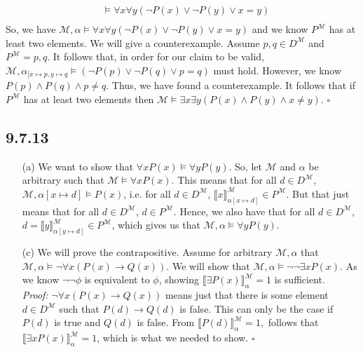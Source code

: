 \begin{enumerate}
\begin{align*}
        &\vDash \forall x \forall y (\neg P(x) \vee \neg P(y) \vee x = y) \\
    \end{align*} 
    So, we have $\mathcal{M}, \alpha \vDash \forall x \forall y (\neg P(x) \vee \neg P(y) \vee x = y)$ and we know $P^\mathcal{M}$ has at least two elements. We will give a counterexample. Assume $p, q \in D^\mathcal{M}$ and $P^\mathcal{M} = {p, q}$. It follows that, in order for our claim to be valid, $\mathcal{M}, \alpha_{[x \mapsto p, y \mapsto q} \vDash (\neg P(p) \vee \neg P(q) \vee p = q)$ must hold. However, we know $P(p) \wedge P(q) \wedge p \neq q$. Thus, we have found a counterexample. It follows that if $P^{\mathcal{M}}$ has at least two elements then $\mathcal{M} \vDash \exists x \exists y (P(x) \wedge P(y) \wedge x \neq y)$. $\square$
\end{enumerate}

\subsection*{9.7.13}

\begin{enumerate}

\item[(a)] We want to show that $\forall x P(x)\vDash \forall
  yP(y)$. So, let $\mathcal{M}$ and $\alpha$ be arbitrary such that
  $\mathcal{M}\vDash\forall xP(x)$. This means that for all $d\in
  D^\mathcal{M}$, $\mathcal{M},\alpha[x\mapsto d]\vDash P(x)$,
  i.e. for all $d\in D^\mathcal{M}$, $\llbracket
  x\rrbracket^\mathcal{M}_{\alpha[x\mapsto d]}\in P^\mathcal{M}$. But
  that just means that for all $d\in D^\mathcal{M}$, $d\in
  P^\mathcal{M}$. Hence, we also have that for all $d\in
  D^\mathcal{M}$,   $d=\llbracket
  y\rrbracket^\mathcal{M}_{\alpha[y\mapsto d]}\in P^\mathcal{M}$,
  which gives us that $\mathcal{M},\alpha\vDash\forall y P(y)$.
  
\item[(c)] We will prove the contrapositive. Assume for arbitrary $\mathcal{M}, \alpha$ that $\mathcal{M}, \alpha \vDash \neg \forall x (P(x) \rightarrow Q(x))$. We will show that $\mathcal{M}, \alpha \vDash \neg \neg \exists x P(x)$. As we know $\neg \neg \phi$ is equivalent to $\phi$, showing $\llbracket\exists P(x)\rrbracket_\alpha^\mathcal{M} =1$ is sufficient.\\\textit{Proof:} $\neg \forall x (P(x) \rightarrow Q(x)) $ means just that there is some element $d \in D^\mathcal{M}$ such that $P(d) \rightarrow Q(d)$ is false. This can only be the case if $P(d)$ is true and $Q(d)$ is false. From $\llbracket P(d)\rrbracket_\alpha^\mathcal{M}=1$,\ follows that $\llbracket \exists x P(x)\rrbracket_\alpha^\mathcal{M} =1$, which is what we needed to show. $\square$

\end{enumerate}


